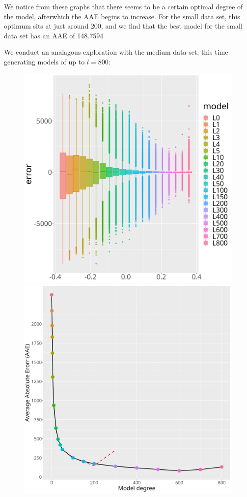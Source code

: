 \documentclass[a4paper]{article}
\theoremstyle{definition}
\begin{document}
We notice from these graphs that there seems to be a certain optimal degree of the model, afterwhich the AAE begins to increase.
For the small data set, this optimum sits at just around 200, and we find that the best model for the small data set has an AAE of 
148.7594

We conduct an analagous exploration with the medium data set, this time generating models of up to $l = 800$:

\begin{figure}[h!]
    \begin{minipage}{.45\textwidth}
        \centering
            \includegraphics[width=0.9\linewidth]{media/med_error_box.png}
    \end{minipage}
    \begin{minipage}{.45\textwidth}
        \centering
            \includegraphics[width=0.9\linewidth]{media/med_err.png}

\end{minipage}
\end{figure}
\end{document}
